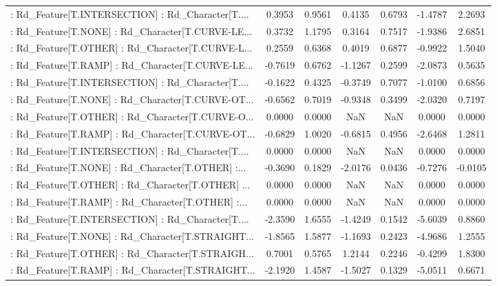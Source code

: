 \begin{longtable}{p{4cm}cccccc}
 : Rd\_Feature[T.INTERSECTION] : Rd\_Character[T.... &  0.3953 &    0.9561 &  0.4135 &       0.6793 & -1.4787 &  2.2693 \\
 : Rd\_Feature[T.NONE] : Rd\_Character[T.CURVE-LE... &  0.3732 &    1.1795 &  0.3164 &       0.7517 & -1.9386 &  2.6851 \\
 : Rd\_Feature[T.OTHER] : Rd\_Character[T.CURVE-L... &  0.2559 &    0.6368 &  0.4019 &       0.6877 & -0.9922 &  1.5040 \\
 : Rd\_Feature[T.RAMP] : Rd\_Character[T.CURVE-LE... & -0.7619 &    0.6762 & -1.1267 &       0.2599 & -2.0873 &  0.5635 \\
 : Rd\_Feature[T.INTERSECTION] : Rd\_Character[T.... & -0.1622 &    0.4325 & -0.3749 &       0.7077 & -1.0100 &  0.6856 \\
 : Rd\_Feature[T.NONE] : Rd\_Character[T.CURVE-OT... & -0.6562 &    0.7019 & -0.9348 &       0.3499 & -2.0320 &  0.7197 \\
 : Rd\_Feature[T.OTHER] : Rd\_Character[T.CURVE-O... &  0.0000 &    0.0000 &     NaN &          NaN &  0.0000 &  0.0000 \\
 : Rd\_Feature[T.RAMP] : Rd\_Character[T.CURVE-OT... & -0.6829 &    1.0020 & -0.6815 &       0.4956 & -2.6468 &  1.2811 \\
 : Rd\_Feature[T.INTERSECTION] : Rd\_Character[T.... &  0.0000 &    0.0000 &     NaN &          NaN &  0.0000 &  0.0000 \\
 : Rd\_Feature[T.NONE] : Rd\_Character[T.OTHER] :... & -0.3690 &    0.1829 & -2.0176 &       0.0436 & -0.7276 & -0.0105 \\
 : Rd\_Feature[T.OTHER] : Rd\_Character[T.OTHER] ... &  0.0000 &    0.0000 &     NaN &          NaN &  0.0000 &  0.0000 \\
 : Rd\_Feature[T.RAMP] : Rd\_Character[T.OTHER] :... &  0.0000 &    0.0000 &     NaN &          NaN &  0.0000 &  0.0000 \\
 : Rd\_Feature[T.INTERSECTION] : Rd\_Character[T.... & -2.3590 &    1.6555 & -1.4249 &       0.1542 & -5.6039 &  0.8860 \\
 : Rd\_Feature[T.NONE] : Rd\_Character[T.STRAIGHT... & -1.8565 &    1.5877 & -1.1693 &       0.2423 & -4.9686 &  1.2555 \\
 : Rd\_Feature[T.OTHER] : Rd\_Character[T.STRAIGH... &  0.7001 &    0.5765 &  1.2144 &       0.2246 & -0.4299 &  1.8300 \\
 : Rd\_Feature[T.RAMP] : Rd\_Character[T.STRAIGHT... & -2.1920 &    1.4587 & -1.5027 &       0.1329 & -5.0511 &  0.6671 \\

\end{longtable}

